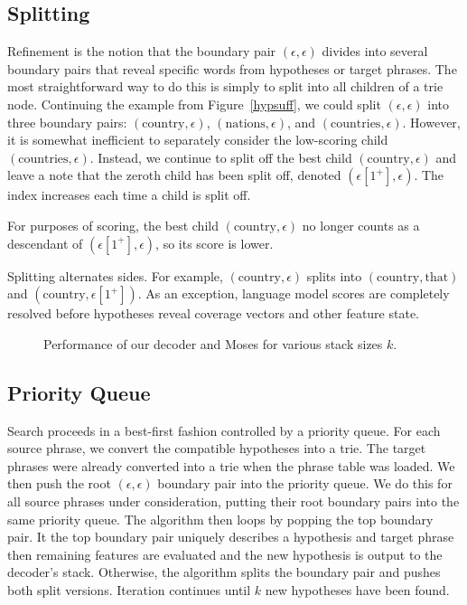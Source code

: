 \documentclass[11pt]{article}
\begin{document}
\subsection{Splitting}
Refinement is the notion that the boundary pair $(\epsilon, \epsilon)$ divides into several boundary pairs that reveal specific words from hypotheses or target phrases.  The most straightforward way to do this is simply to split into all children of a trie node.  Continuing the example from Figure~\ref{hypsuff}, we could split $(\epsilon, \epsilon)$ into three boundary pairs: $(\text{country}, \epsilon)$, $(\text{nations}, \epsilon)$, and $(\text{countries}, \epsilon)$.  However, it is somewhat inefficient to separately consider the low-scoring child $(\text{countries}, \epsilon)$.  Instead, we continue to split off the best child $(\text{country}, \epsilon)$ and leave a note that the zeroth child has been split off, denoted $(\epsilon[1^+], \epsilon)$.  The index increases each time a child is split off.  

For purposes of scoring, the best child $(\text{country}, \epsilon)$ no longer counts as a descendant of $(\epsilon[1^+], \epsilon)$, so its score is lower.   

Splitting alternates sides.  For example, $(\text{country}, \epsilon)$ splits into $(\text{country}, \text{that})$ and $(\text{country}, \epsilon[1^+])$.  As an exception, language model scores are completely resolved before hypotheses reveal coverage vectors and other feature state.  

\begin{figure*}[t]%

\caption{\label{results}Performance of our decoder and Moses for various stack sizes $k$.}
\end{figure*}

\subsection{Priority Queue}
Search proceeds in a best-first fashion controlled by a priority queue.  For each source phrase, we convert the compatible hypotheses into a trie.  The target phrases were already converted into a trie when the phrase table was loaded.  We then push the root $(\epsilon, \epsilon)$ boundary pair into the priority queue.  We do this for all source phrases under consideration, putting their root boundary pairs into the same priority queue.  The algorithm then loops by popping the top boundary pair.  It the top boundary pair uniquely describes a hypothesis and target phrase then remaining features are evaluated and the new hypothesis is output to the decoder's stack.  Otherwise, the algorithm splits the boundary pair and pushes both split versions.  Iteration continues until $k$ new hypotheses have been found.  
\end{document}
